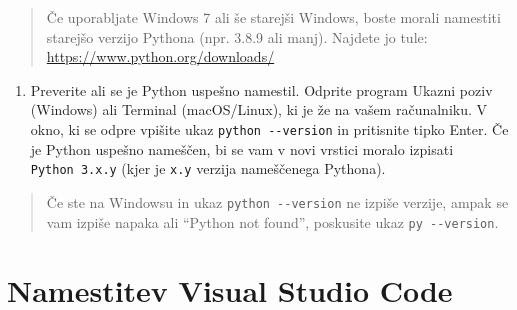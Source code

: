 \documentclass[
]{report}
\providecommand{\tightlist}{%
  \setlength{\itemsep}{0pt}\setlength{\parskip}{0pt}}
\begin{document}
\begin{quote}
Če uporabljate Windows 7 ali še starejši Windows, boste morali namestiti
starejšo verzijo Pythona (npr. 3.8.9 ali manj). Najdete jo tule:
\url{https://www.python.org/downloads/}
\end{quote}

\begin{enumerate}
\def\labelenumi{\arabic{enumi}.}
\setcounter{enumi}{1}
\tightlist
\item
  Preverite ali se je Python uspešno namestil. Odprite program Ukazni poziv (Windows)
  ali Terminal (macOS/Linux), ki je že na vašem računalniku. V okno, ki se odpre
  vpišite ukaz \texttt{python\ -\/-version} in pritisnite tipko Enter. Če je Python
  uspešno nameščen, bi se vam v novi vrstici moralo izpisati \texttt{Python\ 3.x.y}
  (kjer je \texttt{x.y} verzija nameščenega Pythona).
\end{enumerate}

\begin{quote}
Če ste na Windowsu in ukaz \texttt{python\ -\/-version} ne izpiše verzije, ampak se vam izpiše napaka ali ``Python not found'', poskusite ukaz \texttt{py\ -\/-version}.
\end{quote}

\hypertarget{namestitev-visual-studio-code}{%
\section{Namestitev Visual Studio Code}\label{namestitev-visual-studio-code}}
\end{document}
